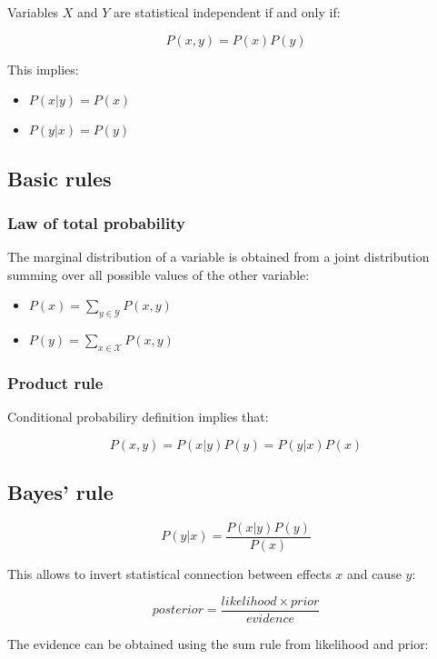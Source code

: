 Variables $X$ and $Y$ are statistical independent if and only if:

$$P(x,y) = P(x)P(y)$$

This implies:

\begin{multicols}{2}
	\begin{itemize}
		\item $P(x|y) = P(x)$
		\item $P(y|x) = P(y)$
	\end{itemize}
\end{multicols}

	\subsection{Basic rules}

		\subsubsection{Law of total probability}
		The marginal distribution of a variable is obtained from a joint distribution summing over all possible values of the other variable:

		\begin{multicols}{2}
			\begin{itemize}
				\item $P(x) = \sum\limits_{y\in\mathcal{Y}}P(x,y)$
				\item $P(y) = \sum\limits_{x\in\mathcal{X}}P(x,y)$
			\end{itemize}
		\end{multicols}

		\subsubsection{Product rule}
		Conditional probabiliry definition implies that:

		$$P(x,y) = P(x|y)P(y) = P(y|x)P(x)$$

	\subsection{Bayes' rule}

	$$P(y|x) = \frac{P(x|y)P(y)}{P(x)}$$

	This allows to invert statistical connection between effects $x$ and cause $y$:

	$$posterior = \frac{likelihood\times prior}{evidence}$$

	The evidence can be obtained using the sum rule from likelihood and prior:


